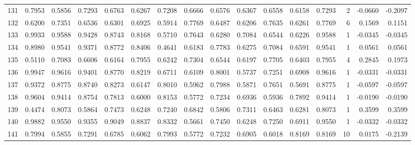 \begin{tabular}{lrrrrrrrrrrrrrrr}
131 &      0.7953 &  0.5856 &  0.7293 &  0.6763 &  0.6267 &  0.7208 &  0.6666 &  0.6576 &  0.6367 &  0.6558 &   0.6158 &     0.7293 &      2 &                   -0.0660 &                    -0.2097 \\
132 &      0.6200 &  0.7351 &  0.6536 &  0.6301 &  0.6925 &  0.5914 &  0.7769 &  0.6487 &  0.6206 &  0.7635 &   0.6261 &     0.7769 &      6 &                    0.1569 &                     0.1151 \\
133 &      0.9933 &  0.9588 &  0.9428 &  0.8743 &  0.8168 &  0.5710 &  0.7643 &  0.6280 &  0.7084 &  0.6544 &   0.6226 &     0.9588 &      1 &                   -0.0345 &                    -0.0345 \\
134 &      0.8980 &  0.9541 &  0.9371 &  0.8772 &  0.8406 &  0.4641 &  0.6183 &  0.7783 &  0.6275 &  0.7084 &   0.6591 &     0.9541 &      1 &                    0.0561 &                     0.0561 \\
135 &      0.5110 &  0.7083 &  0.6606 &  0.6164 &  0.7955 &  0.6242 &  0.7304 &  0.6544 &  0.6197 &  0.7705 &   0.6403 &     0.7955 &      4 &                    0.2845 &                     0.1973 \\
136 &      0.9947 &  0.9616 &  0.9401 &  0.8770 &  0.8219 &  0.6711 &  0.6109 &  0.8001 &  0.5737 &  0.7251 &   0.6908 &     0.9616 &      1 &                   -0.0331 &                    -0.0331 \\
137 &      0.9372 &  0.8775 &  0.8740 &  0.8273 &  0.6147 &  0.8010 &  0.5962 &  0.7988 &  0.5871 &  0.7651 &   0.5691 &     0.8775 &      1 &                   -0.0597 &                    -0.0597 \\
138 &      0.9604 &  0.9414 &  0.8754 &  0.7813 &  0.6000 &  0.8153 &  0.5772 &  0.7234 &  0.6936 &  0.5936 &   0.7892 &     0.9414 &      1 &                   -0.0190 &                    -0.0190 \\
139 &      0.4474 &  0.8073 &  0.5864 &  0.7473 &  0.6248 &  0.7240 &  0.6842 &  0.5806 &  0.7311 &  0.6463 &   0.6281 &     0.8073 &      1 &                    0.3599 &                     0.3599 \\
140 &      0.9882 &  0.9550 &  0.9355 &  0.9049 &  0.8837 &  0.8332 &  0.5661 &  0.7450 &  0.6248 &  0.7250 &   0.6911 &     0.9550 &      1 &                   -0.0332 &                    -0.0332 \\
141 &      0.7994 &  0.5855 &  0.7291 &  0.6785 &  0.6062 &  0.7993 &  0.5772 &  0.7232 &  0.6905 &  0.6018 &   0.8169 &     0.8169 &     10 &                    0.0175 &                    -0.2139 \\

\end{tabular}
